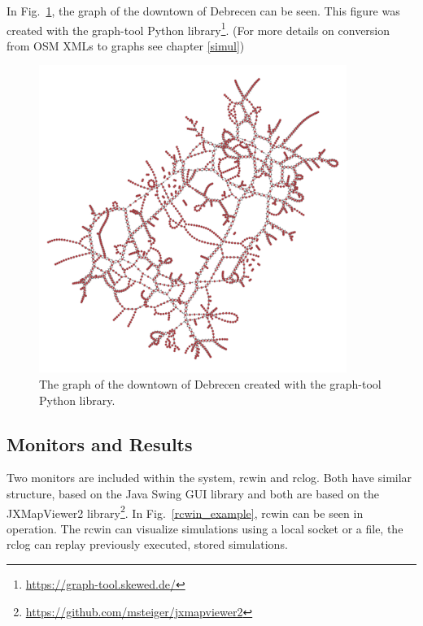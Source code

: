 \documentclass[b5paper,12pt]{report}
\theoremstyle{definition}
\begin{document}
In Fig.~\ref{dd_graph}, the graph of the downtown of Debrecen can be seen. This figure was created with the graph-tool Python library\footnote{\url{https://graph-tool.skewed.de/}}. (For more details on conversion from OSM XMLs to graphs see chapter \ref{simul})

\begin{figure}[ht!]
\centering
\includegraphics[width=10cm]{img/debrecen_downtown.pdf}
\caption{The graph of the downtown of Debrecen created with the graph-tool Python library.}
\label{dd_graph}
\end{figure}

\subsection{Monitors and Results}

Two monitors are included within the system, rcwin and rclog. Both have similar structure, based on the Java Swing GUI library and both are based on the JXMapViewer2 library\footnote{\url{https://github.com/msteiger/jxmapviewer2}}. In Fig.~\ref{rcwin_example}, rcwin can be seen in operation. The rcwin can visualize simulations using a local socket or a file, the rclog can replay previously executed, stored simulations.
\end{document}

